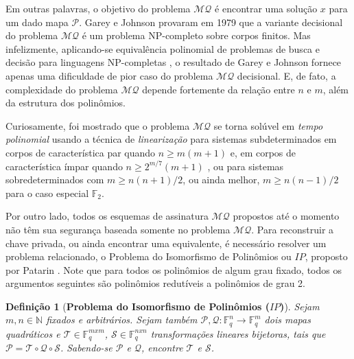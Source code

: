 \documentclass{SBCbookchapter}
\newcommand{\F}{\mathbb{F}}
\newcommand{\MQ}{\mathcal{MQ}}
\newcommand{\N}{\mathbb{N}}
\newtheorem{definition}{Definição}{\bfseries}{\itshape}
\begin{document}
\begin{otherlanguage}{brazilian}
Em outras palavras, o objetivo do  problema $\MQ$ é encontrar uma solução $x$ para um dado mapa $\mathcal{P}$. Garey e Johnson provaram em 1979 \cite[página 251]{garey-johnson} que a variante decisional do problema $\MQ$ é um problema NP-completo sobre corpos finitos. Mas infelizmente, aplicando-se equivalência polinomial de problemas de busca e decisão para linguagens NP-completas \cite{bellare-goldwasser}, o resultado de Garey e Johnson fornece apenas uma dificuldade de pior caso do problema $\MQ$ decisional. E, de fato, a complexidade do problema $\MQ$ depende fortemente da relação entre $n$ e $m$, além da estrutura dos polinômios.

Curiosamente, foi mostrado que o problema $\MQ$ se torna solúvel em \emph{tempo polinomial} usando a técnica de \emph{linearização} para sistemas subdeterminados em corpos de característica par quando $n \ge m(m+1)$ e, em corpos de característica ímpar quando $n \ge 2^{m/7}(m+1)$  \cite[Sec. 7]{kipnis-patarin-goubin-ext} \cite{courtois-goubin-meier-tacier}, ou para sistemas sobredeterminados com $m \ge n(n+1)/2$, ou ainda melhor, $m \ge n(n-1)/2$ para o caso especial $\F_2$. %

Por outro lado, todos os esquemas de assinatura $\MQ$ propostos até o momento não têm sua segurança baseada somente no problema $\MQ$. Para reconstruir a chave privada, ou ainda encontrar uma equivalente, é necessário resolver um problema relacionado, o Problema do Isomorfismo de Polinômios ou $IP$, proposto por Patarin \cite{patarin-ip}. Note que para todos os polinômios de algum grau fixado, todos os argumentos seguintes são polinômios redutíveis a polinômios de grau 2. %


\begin{definition}[\textbf{Problema do Isomorfismo de Polinômios ($IP$)}] \label{def:IP}
Sejam $m,n \in \N$ fixados e arbitrários. Sejam também $\mathcal{P},\mathcal{Q} : \F_q^n \rightarrow \F_q^m$ dois mapas quadráticos e $\mathcal{T} \in \F_q^{mxm}$, $\mathcal{S} \in \F_q^{nxn}$ transformações lineares bijetoras, tais que $\mathcal{P} = \mathcal{T} \circ \mathcal{Q} \circ \mathcal{S}$. Sabendo-se $\mathcal{P}$ e $\mathcal{Q}$, encontre $\mathcal{T}$ e $\mathcal{S}$.
\end{definition}


\end{otherlanguage}
\end{document}
